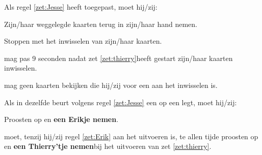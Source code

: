 \vervolgLijst{}   
    \item \label{zet:Jesse_2} Als \eenSpeler regel \ref{zet:Jesse} heeft toegepast, moet hij/zij:
    \puntLijst{}
        \item Zijn/haar weggelegde kaarten terug in zijn/haar hand nemen.
        \item Stoppen met het inwisselen van zijn/haar kaarten. 
    \eindPuntLijst{}
\eindLijst{}

\vervolgLijst{}
    \item \Frits mag pas 9 seconden nadat \eenSpeler zet \ref{zet:thierry}\footnotemark[1] heeft gestart zijn/haar kaarten inwisselen. 
\eindLijst{}

\vervolgLijst{}
    \item \Frits mag geen kaarten bekijken die hij/zij voor een \andereSpeler aan het inwisselen is.
\eindLijst{}

\vervolgLijst{}
    \item \label{zet:Erik} Als \eenSpeler in dezelfde beurt volgens regel \ref{zet:Jesse} een \footnotemark[3] op een \footnotemark[4] legt, moet hij/zij:
    \puntLijst{}
        \item Proosten op  en \textbf{een Erikje nemen}\footnotemark[6].
    \eindPuntLijst{}
\eindLijst{}

\vervolgLijst{}
    \item \label{zet:Erik_2} \EenSpeler moet, tenzij hij/zij regel \ref{zet:Erik} aan het uitvoeren is, te allen tijde proosten op  en \textbf{een Thierry'tje nemen}\footnotemark[6] bij het uitvoeren van zet \ref{zet:thierry}\footnotemark[1].
\eindLijst{}

